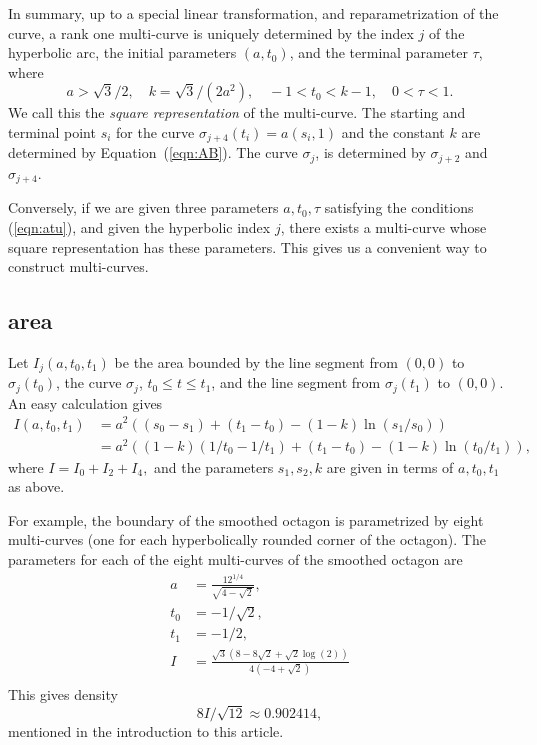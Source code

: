 \documentclass[11pt]{amsart}
\def\ta{{\tau}}
\begin{document}
In summary, up to a special linear transformation, and
reparametrization of the curve, a rank one multi-curve is uniquely
determined by the index $j$ of the hyperbolic arc, the initial
parameters $(a,t_0)$, and the terminal parameter $\ta$, where
  \begin{equation}\label{eqn:atu}
  a > \sqrt{3}/2,\quad  k = \sqrt{3}/(2a^2),\quad -1 < t_0 < k - 1,
  \quad 0 < \ta < 1.
  \end{equation}
  We call this the {\it square representation} of the multi-curve.
  The starting and terminal point $s_i$ for the curve
  $\sigma_{j+4}(t_i) = a(s_i,1)$ and the constant $k$ are determined
  by Equation~(\ref{eqn:AB}).  The curve $\sigma_{j}$, is determined
  by $\sigma_{j+2}$ and $\sigma_{j+4}$.

Conversely, if we are given three parameters $a,t_0,\ta$ satisfying
the conditions (\ref{eqn:atu}), and given the hyperbolic index $j$, 
there exists a multi-curve whose
square representation has these parameters.  This gives us a convenient
way to construct multi-curves.  

\subsection{area}

Let $I_j(a,t_0,t_1)$ be the area bounded by the line segment from
$(0,0)$ to $\sigma_j(t_0)$, the curve $\sigma_j$, $t_0\le t\le t_1$,
and the line segment from $\sigma_j(t_1)$ to $(0,0)$.  An easy
calculation gives
\begin{equation}\label{eqn:I}
\begin{array}{lll}
 I(a,t_0,t_1) &=
  a^2((s_0-s_1)+(t_1-t_0) - (1-k)\ln (s_1/s_0))\\
 &= a^2 ((1-k) (1/t_0-1/t_1) + (t_1-t_0) -(1-k) \ln (t_0/t_1)),
\end{array}
\end{equation}
where 
$I=I_0+I_2+I_4,$ and the parameters $s_1,s_2,k$ are given in terms
of $a,t_0,t_1$ as above.

For example, the boundary of the 
smoothed octagon is parametrized by eight multi-curves (one for
each hyperbolically rounded corner of the octagon).  The parameters
for each of the eight multi-curves of the smoothed octagon are
\[
\begin{array}{lll}
a &= \frac{12^{1/4}}{\sqrt{4-\sqrt{2}}},\\
t_0 &= -1/\sqrt{2},\\
t_1 &= -1/2,\\
I &= \frac{\sqrt{3} \left(8-8 \sqrt{2}+\sqrt{2} \log (2)\right)}{4
   \left(-4+\sqrt{2}\right)}\\
\end{array}
\]
This gives density
\[8 I/\sqrt{12} \approx 0.902414,\]
mentioned in the introduction to this article.
\end{document}
